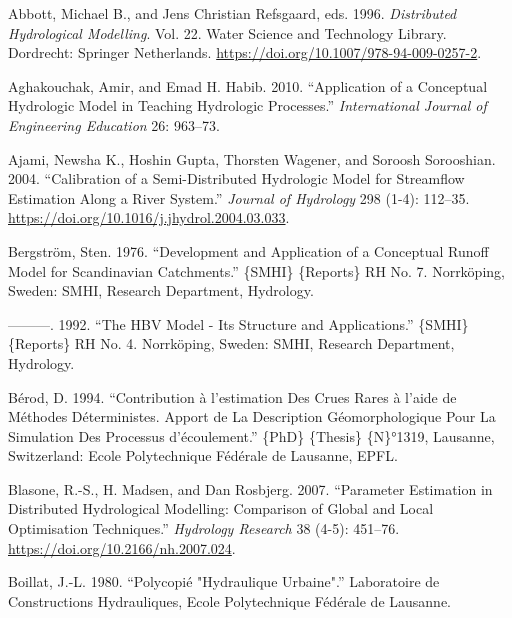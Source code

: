 \documentclass[
  letterpaper,
  DIV=11,
  numbers=noendperiod]{scrreprt}
\newlength{\cslhangindent}
\newlength{\cslentryspacingunit} %
\newenvironment{CSLReferences}[2] %
 {%
  \setlength{\parindent}{0pt}
  \ifodd #1
  \let\oldpar\par
  \def\par{\hangindent=\cslhangindent\oldpar}
  \fi
  \setlength{\parskip}{#2\cslentryspacingunit}
 }%
 {}
\begin{document}
\hypertarget{refs}{}
\begin{CSLReferences}{1}{0}
\leavevmode{}%
Abbott, Michael B., and Jens Christian Refsgaard, eds. 1996.
\emph{Distributed {Hydrological} {Modelling}}. Vol. 22. Water {Science}
and {Technology} {Library}. Dordrecht: Springer Netherlands.
\url{https://doi.org/10.1007/978-94-009-0257-2}.

\leavevmode{}%
Aghakouchak, Amir, and Emad H. Habib. 2010. {``Application of a
{Conceptual} {Hydrologic} {Model} in {Teaching} {Hydrologic}
{Processes}.''} \emph{International Journal of Engineering Education}
26: 963--73.

\leavevmode{}%
Ajami, Newsha K., Hoshin Gupta, Thorsten Wagener, and Soroosh
Sorooshian. 2004. {``Calibration of a Semi-Distributed Hydrologic Model
for Streamflow Estimation Along a River System.''} \emph{Journal of
Hydrology} 298 (1-4): 112--35.
\url{https://doi.org/10.1016/j.jhydrol.2004.03.033}.

\leavevmode{}%
Bergström, Sten. 1976. {``Development and Application of a Conceptual
Runoff Model for {Scandinavian} Catchments.''} \{SMHI\} \{Reports\} RH
No. 7. Norrköping, Sweden: SMHI, Research Department, Hydrology.

\leavevmode{}%
---------. 1992. {``The {HBV} Model - Its Structure and Applications.''}
\{SMHI\} \{Reports\} RH No. 4. Norrköping, Sweden: SMHI, Research
Department, Hydrology.

\leavevmode{}%
Bérod, D. 1994. {``Contribution à l'estimation Des Crues Rares à l'aide
de Méthodes Déterministes. {Apport} de La Description Géomorphologique
Pour La Simulation Des Processus d'écoulement.''} \{PhD\} \{Thesis\}
\{N\}°1319, Lausanne, Switzerland: Ecole Polytechnique Fédérale de
Lausanne, EPFL.

\leavevmode{}%
Blasone, R.-S., H. Madsen, and Dan Rosbjerg. 2007. {``Parameter
Estimation in Distributed Hydrological Modelling: Comparison of Global
and Local Optimisation Techniques.''} \emph{Hydrology Research} 38
(4-5): 451--76. \url{https://doi.org/10.2166/nh.2007.024}.

\leavevmode{}%
Boillat, J.-L. 1980. {``Polycopié "{Hydraulique} Urbaine".''}
Laboratoire de Constructions Hydrauliques, Ecole Polytechnique Fédérale
de Lausanne.


\end{CSLReferences}
\end{document}
